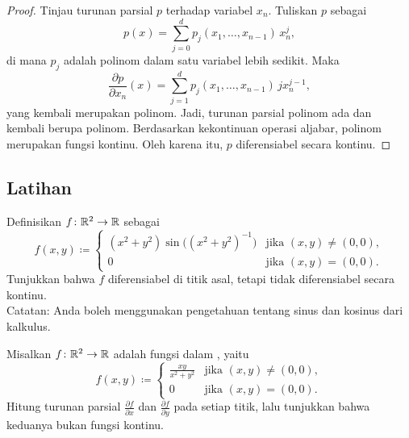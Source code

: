 \begin{proof}
Tinjau turunan parsial $p$ terhadap variabel $x_n$.
Tuliskan $p$ sebagai
\begin{equation*}
p(x) = \sum_{j=0}^d p_j(x_1,\ldots,x_{n-1}) \, x_n^j ,
\end{equation*}
di mana $p_j$ adalah polinom dalam satu variabel lebih sedikit.
Maka
\begin{equation*}
\frac{\partial p}{\partial x_n}(x)
= \sum_{j=1}^d p_j(x_1,\ldots,x_{n-1}) \, j x_n^{j-1} ,
\end{equation*}
yang kembali merupakan polinom.
Jadi, turunan parsial polinom ada dan kembali berupa polinom.
Berdasarkan kekontinuan operasi aljabar, polinom merupakan fungsi kontinu.
Oleh karena itu, $p$ diferensiabel secara kontinu.
\end{proof}

\subsection{Latihan}

\begin{exercise}
Definisikan $f \colon {\mathbb{R}}^2 \to {\mathbb{R}}$ sebagai
\begin{equation*}
f(x,y) \coloneqq
\begin{cases}
(x^2+y^2)\sin\bigl({(x^2+y^2)}^{-1}\bigr) & \text{jika } (x,y) \neq (0,0), \\
0                                         & \text{jika } (x,y) = (0,0).
\end{cases}
\end{equation*}
Tunjukkan bahwa $f$ diferensiabel di titik asal, tetapi tidak 
diferensiabel secara kontinu.
\\
Catatan: Anda boleh menggunakan pengetahuan tentang sinus dan kosinus dari kalkulus.
\end{exercise}

\begin{exercise}
Misalkan $f \colon {\mathbb{R}}^2 \to {\mathbb{R}}$ adalah fungsi dalam
, yaitu
\begin{equation*}
f(x,y)
\coloneqq
\begin{cases}
\frac{xy}{x^2+y^2} & \text{jika } (x,y) \neq (0,0), \\
0                  & \text{jika } (x,y) = (0,0).
\end{cases}
\end{equation*}
Hitung turunan parsial 
$\frac{\partial f}{\partial x}$ dan
$\frac{\partial f}{\partial y}$ pada setiap titik, lalu tunjukkan bahwa keduanya bukan
fungsi kontinu.
\end{exercise}

